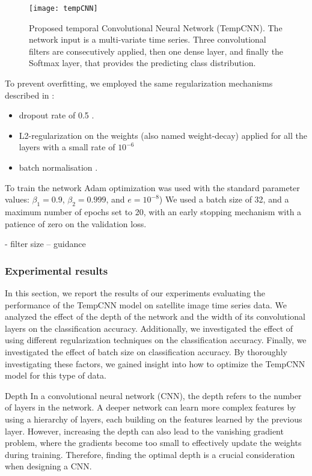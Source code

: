 \begin{figure}[!htbp]
  \centering
  \texttt{[image: tempCNN]}
  \caption{Proposed temporal Convolutional Neural Network (TempCNN). The network input is a
  multi-variate time series. Three convolutional filters are consecutively applied, then one dense layer,
  and finally the Softmax layer, that provides the predicting class distribution.    \cite{tempCNN}}
  \label{tab:temCNNArchitecture}
\end{figure}


To prevent overfitting, we employed the same regularization mechanisms described in \cite{tempCNN}:

\begin{itemize}
  \item dropout rate of 0.5 \cite{JMLR:v15:srivastava14a}. 
  \item L2-regularization on the weights (also named weight-decay) applied for all the layers with a small rate of $10^{-6}$ 
  \item batch normalisation \cite{DBLP:journals/corr/IoffeS15}.
\end{itemize}

To train the network Adam optimization was used with the standard parameter values: $\beta_1 = 0.9$, $\beta_2 = 0.999$, and $e = 10^{-8}$) \cite{kingma2014adam} 
We used a batch size of 32, and a maximum number of epochs set to 20, with an early stopping mechanism with a patience of zero on the validation loss. 



- filter size
-- guidance

\subsubsection{Experimental results}

In this section, we report the results of our experiments evaluating the performance of the TempCNN model on satellite image time series data.
We analyzed the effect of the depth of the network and the width of its convolutional layers on the classification accuracy.
Additionally, we investigated the effect of using different regularization techniques on the classification accuracy.
Finally, we investigated the effect of batch size on classification accuracy. 
By thoroughly investigating these factors, we gained insight into how to optimize the TempCNN model for this type of data.


\begin{paragraph}{Depth}
In a convolutional neural network (CNN), the depth refers to the number of layers in the network.
A deeper network can learn more complex features by using a hierarchy of layers, each building on the features learned by the previous layer.
However, increasing the depth can also lead to the vanishing gradient problem, where the gradients become too small to effectively update the weights during training.
Therefore, finding the optimal depth is a crucial consideration when designing a CNN.
\end{paragraph}


